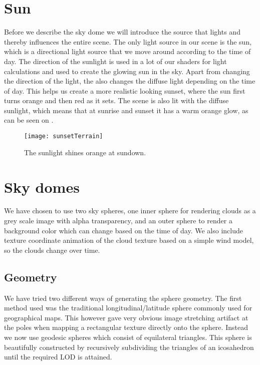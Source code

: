 \section{Sun}
Before we describe the sky dome we will introduce the source that
lights and thereby influences the entire scene. The only light source
in our scene is the sun, which is a directional light source that we
move around according to the time of day. The direction of the
sunlight is used in a lot of our shaders for light calculations and
used to create the glowing sun in the sky. Apart from changing the
direction of the light, the  also changes the diffuse
light depending on the time of day. This helps us create a more
realistic looking sunset, where the sun first turns orange and then
red as it sets. The scene is also lit with the diffuse sunlight, which
means that at sunrise and sunset it has a warm orange glow, as can be
seen on .

\begin{figure}
  \centering
  \texttt{[image: sunsetTerrain]}
  \caption{The sunlight shines orange at sundown.}
  \label{fig:sunsetTerrain}
\end{figure}



\section{Sky domes}
We have chosen to use two sky spheres, one inner sphere for rendering
clouds as a grey scale image with alpha transparency, and an outer
sphere to render a background color which can change based on the time
of day. We also include texture coordinate animation of the cloud
texture based on a simple wind model, so the clouds change over time.

\subsection{Geometry}
We have tried two different ways of generating the sphere
geometry. The first method used was the traditional
longitudinal/latitude sphere commonly used for geographical maps. This
however gave very obvious image stretching artifact at the poles when
mapping a rectangular texture directly onto the sphere. Instead we now
use geodesic spheres which consist of equilateral triangles. This
sphere is beautifully constructed by recursively subdividing the
triangles of an icosahedron until the required LOD is attained.

